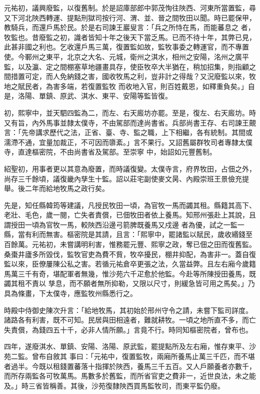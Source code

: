 \begin{pinyinscope}
 元祐初，議興廢監，以復舊制。於是詔庫部郎中郭茂恂往陜西、河東所當置監，尋又下河北陜西轉運、提點刑獄司按行河、渭、並、晉之間牧田以聞。時已罷保甲，教騎兵，而還戶馬於民。於是右司諫王巖叟言：「兵之所恃在馬，而能蕃息之
 者，牧監也。昔廢監之初，識者皆知十年之後天下當乏馬。已而不待十年，其弊已見，此甚非國之利也。乞收還戶馬三萬，復置監如故，監牧事委之轉運官，而不專置使。今鄆州之東平，北京之大名、元城，衛州之淇水，相州之安陽，洺州之廣平監，以及瀛、定之間棚塞草地疆畫具存，使臣牧卒大半猶在，稍加招集，則指顧之間措置可定，而人免納錢之害，國收牧馬之利，豈非計之得哉？又況廢監以來，牧地之賦民者，為害多端，若復置監牧
 而收地入官，則百姓戴恩，如釋重負矣。」自是，洛陽、單鎮、原武、淇水、東平、安陽等監皆復。



 初，熙寧中，並天駟四監為二，而左、右天廄坊亦罷。至是，復左、右天廄坊。時又有旨，內外馬事並隸太僕寺，不由駕部而達尚書省。兵部尚書王存、右司諫王覿言：「先帝講求歷代之法，正省、臺、寺、監之職，上下相繼，各有統制。其間或濡滯不通，宜量加裁正，不可因而隳紊。」言不果行。又詔舊屬群牧司者專隸太僕寺，直達樞密院，不由尚書省及駕部。至崇寧
 中，始詔如元豐舊制。



 紹聖初，用事者更以其意為廢置，而時議復變。太僕寺言，府界牧田，占佃之外，尚存三千餘頃，議復畿內孳生十監。詔以莊宅副使麥文昺、內殿崇班王景儉充提舉。後二年而給地牧馬之政行矣。



 先是，知任縣韓筠等建議，凡授民牧田一頃，為官牧一馬而蠲其租。縣籍其高下、老壯、毛色，歲一閱，亡失者責償，已佃牧田者依上養馬。知邢州張赴上其說，且謂授田一頃為官牧一馬，較陜西沿邊弓箭脾既養馬又戍邊
 者為優，試之一監一縣，當有利而無害。樞密院是其請，且言：「熙寧中，罷諸監以賦民，歲收緡錢至百餘萬。元祐初，未嘗講明利害，惟務罷元豐、熙寧之政，奪已佃之田而復舊監。桑棗井廬多所毀伐，監牧官吏為費不貲，牧卒擾民，棚井抑配，為害非一。蓋自復監以來，臣僚屢陳公私之害。若循元祐倉卒更張之法，久當益弊。且左右廂今歲籍馬萬三千有奇，堪配軍者無幾，惟沙苑六千疋愈於他監。今赴等所陳授田養馬，既蠲其租不責以
 孳息，而不願者無所抑勒，又限以尺寸，則緩急皆可用之馬矣。」乃具為條畫，下太僕寺，應監牧州縣悉行之。



 時殿中侍御史陳次升言：「給地牧馬，其初始於邢州守令之請，未嘗下監司詳度。諸路各有利害，既不可知。民居與田相遠者，難就耕牧。一頃之地所直不多，而亡失責償，為錢四五十千，必非人情所願。」言竟不行。時同知樞密院者，曾布也。



 四年，遂廢淇水、單鎮、安陽、洛陽、原武監，罷提點所及左右廂，惟存東平、沙苑二監。曾布自敘其
 事曰：「元祐中，復置監牧，兩廂所養馬止萬三千匹，而不堪者過半。今既以租錢置蕃落十指揮於陜西，養馬三千五百。又人戶願養者亦數千，而所存兩監各可牧萬馬。馬數多於舊監，而所省官吏之費非一，近世良法，未之能及。」時三省皆稱善。其後，沙苑復隸陜西買馬監牧司，而東平監仍廢。




\end{pinyinscope}
